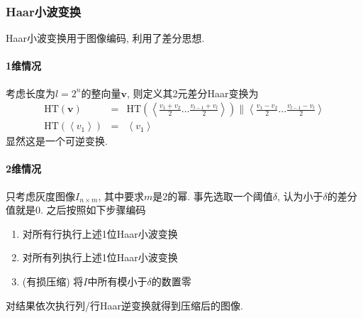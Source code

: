 \documentclass{ctexart}
\begin{document}
\subsubsection{Haar小波变换}
    Haar小波变换用于图像编码, 利用了差分思想.
\paragraph{1维情况} 考虑长度为$l = 2^n$的整向量$ \mathbf{v}$, 则定义其2元差分Haar变换为
    \begin{eqnarray*}
        \mathrm{HT}(\mathbf{v}) &=&
            \mathrm{HT}\left(\left\langle \frac{v_1+v_2}{2} \ldots \frac{v_{l-1} + v_{l}}{2} \right\rangle\right)
            \|  \left\langle \frac{v_1-v_2}{2} \ldots \frac{v_{l-1}-v_{l}}{2}\right\rangle\\
        \mathrm{HT}\left(\left\langle v_1 \right\rangle\right) &=& \left\langle v_1 \right\rangle
    \end{eqnarray*}显然这是一个可逆变换.\par

\paragraph{2维情况} 只考虑灰度图像$I_{n\times m}$, 其中要求$m$是$2$的幂.
    事先选取一个阈值$\delta$, 认为小于$\delta$的差分值就是0. 之后按照如下步骤编码
    \begin{enumerate}
        \item 对所有行执行上述1位Haar小波变换
        \item 对所有列执行上述1位Haar小波变换
        \item (有损压缩) 将$I$中所有模小于$\delta$的数置零
    \end{enumerate}
    对结果依次执行列/行Haar逆变换就得到压缩后的图像.
        
\end{document}
